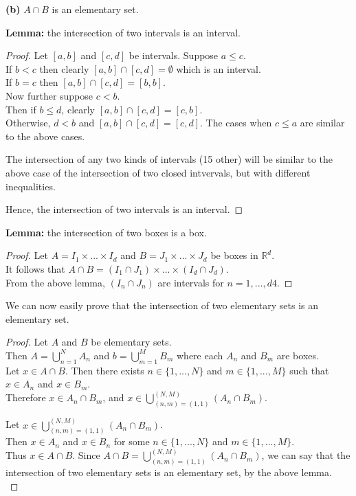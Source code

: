 \documentclass[12pt]{article}
\begin{document}
	\hspace{-4 ex}\textbf{(b)} $A \cap B$ is an elementary set. \bigbreak
	
	\textbf{Lemma:} the intersection of two intervals is an interval.
	
	\begin{proof}
		Let $[a,b]$ and $[c,d]$ be intervals. \bigbreak
		Suppose $a \leq c$. \\
		If $ b < c$ then clearly $[a,b] \cap [c,d] = \emptyset$ which is an interval. \\
		If $b=c$ then $[a,b] \cap [c,d] = [b,b]$. \\
		Now further suppose $ c < b$. \\
		Then if $b \leq d$, clearly $[a,b] \cap [c,d] = [c,b]$. \\
		Otherwise, $ d < b$ and $[a,b] \cap [c,d] = [c,d]$. \bigbreak
		The cases when $c \leq a$ are similar to the above cases. \bigbreak
		
		The intersection of any two kinds of intervals (15 other) will be similar to the above case of the intersection of two closed intvervals, but with different inequalities. \bigbreak
		
		Hence, the intersection of two intervals is an interval.		
	\end{proof}

	\textbf{Lemma:} the intersection of two boxes is a box.
	
	\begin{proof}
		Let $A = I_{1} \times ... \times I_{d}$ and $B = J_{1} \times ... \times J_{d}$ be boxes in $\mathds{R}^{d}$. \\
		It follows that $A \cap B = (I_{1} \cap J_{1}) \times ... \times (I_{d} \cap J_{d})$. \\
		From the above lemma, $(I_{n} \cap J_{n})$ are intervals for $n=1,...,d4$.
	\end{proof}

	We can now easily prove that the intersection of two elementary sets is an elementary set.
	
	\begin{proof}
		Let $A$ and $B$ be elementary sets. \\
		Then $A=\bigcup\limits_{n=1}^{N}A_{n}$ and $b=\bigcup\limits_{m=1}^{M}B_{m}$ where each $A_{n}$ and $B_{m}$ are boxes. \\
		Let $x \in A \cap B$.
		Then there exists $n \in \{1,...,N\}$ and $m \in \{1,...,M\}$ such that $x \in A_{n}$ and $x \in B_{m}$. \\
		Therefore $x \in A_{n} \cap B_{m}$, and $x \in \bigcup\limits_{(n,m)=(1,1)}^{(N,M)}(A_{n} \cap B_{m})$. \bigbreak
		
		Let $x \in \bigcup\limits_{(n,m)=(1,1)}^{(N,M)}(A_{n} \cap B_{m})$. \\
		Then $x \in A_{n}$ and $x \in B_{n}$ for some $n \in \{1,...,N\}$ and $m \in \{1,...,M\}$. \\
		Thus $x \in A \cap B$. \bigbreak
		Since  $A \cap B = \bigcup\limits_{(n,m)=(1,1)}^{(N,M)}(A_{n} \cap B_{m})$, we can say that the intersection of two elementary sets is an elementary set, by the above lemma. \\
	\end{proof}
\end{document}
